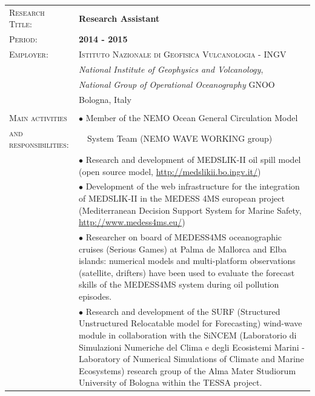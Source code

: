 \documentclass[a4paper, oneside, final]{scrartcl}
\newcommand{\gray}{\rowcolor[gray]{.90}} %
\begin{document}
\begin{tabularx}{0.97\linewidth}{>{\raggedright\scshape}p{4.4cm}|X}
\gray \textsc{Research Title:}  & \textbf{Research Assistant}\\
\gray \textsc{Period:}          & \textbf{2014 - 2015}\\
\textsc{Employer:}        & \textsc{Istituto Nazionale di Geofisica Vulcanologia - INGV} \\
                          & \textit{National Institute of Geophysics and Volcanology},\\
                          & \textit{National Group of Operational Oceanography} GNOO\\         
                           & Bologna, Italy\\
                                 & \\
\textsc{Main activities}        & $\bullet$ Member of the NEMO Ocean General Circulation Model \\
\textsc{and responsibilities:}  & \ \ System Team (NEMO WAVE WORKING group) \\
                                & $\bullet$ Research and development of MEDSLIK-II oil spill model (open source model, \url{http://medslikii.bo.ingv.it/}) \\                                  
                                & $\bullet$ Development of the web infrastructure for the integration of MEDSLIK-II in the MEDESS 4MS european project (Mediterranean Decision Support System for Marine Safety, \url{http://www.medess4ms.eu/}) \\
                                & $\bullet$ Researcher on board of MEDESS4MS oceanographic cruises (Serious Games) at Palma de Mallorca and Elba islands: numerical models and multi-platform observations (satellite, drifters) have been used to evaluate the forecast skills of the MEDESS4MS system during oil pollution episodes.\\
                                & $\bullet$ Research and development of the SURF (Structured Unstructured Relocatable model for Forecasting) wind-wave module in collaboration with the SiNCEM (Laboratorio di Simulazioni Numeriche del Clima e degli Ecosistemi Marini - Laboratory of Numerical Simulations of Climate and Marine Ecosystems) research group of the Alma Mater Studiorum University of Bologna within the TESSA project. \\
\end{tabularx}          
\end{document}
